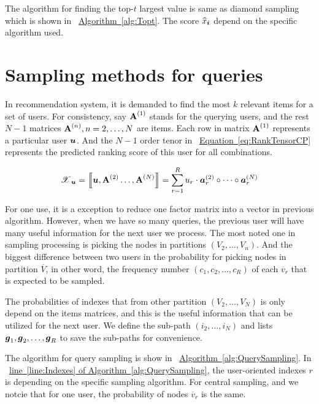 \documentclass[letterpaper]{article}
\newcommand{\T}[1]{\boldsymbol{\mathscr{\MakeUppercase{#1}}}}
\newcommand{\KT}[1]{\left\llbracket #1 \right\rrbracket}
\newcommand{\V}[1]{{\bm{{\MakeLowercase{#1}}}}}
\newcommand{\VnC}[3]{\V{#1}^{(#2)}_{#3}}
\newcommand{\M}[1]{{\bm{\mathbf{\MakeUppercase{#1}}}}}
\newcommand{\Mn}[2]{\M{#1}^{(#2)}}
\newcommand{\Eqn}[1] {\hyperref[eq:#1]  {Equation~\ref*{eq:#1}}}
\newcommand{\Alg}[1] {\hyperref[alg:#1] {Algorithm~\ref*{alg:#1}}}
\newcommand{\AlgLine}[2]{\hyperref[alg:#1]{line~\ref*{line:#2} of Algorithm~\ref*{alg:#1}}}
\begin{document}
The algorithm for finding the top-$t$ largest value is same as diamond sampling which is shown in ~\Alg{Topt}. The score $\widehat{x}_\V{i}$ depend on the specific algorithm used.


\section{Sampling methods for queries}

In recommendation system, it is demanded to find the most $k$ relevant items for a set of users. For consistency, say $\M{A}^{(1)}$ stands for the querying users, and the rest $N-1$ matrices $\M{A}^{(n)},n=2,\ldots,N$ are items. Each row in matrix $\M{A}^{(1)}$ represents a particular user $\V{u}$. And the $N-1$ order tenor in ~\Eqn{RankTensorCP} represents the predicted ranking score of this user for all combinations.

\begin{equation}\label{eq:RankTensorCP}
\T{X}_{\V{u}}= \KT{ \V{u},\Mn{A}{2}\dots,\Mn{A}{N}} =
\sum_{r=1}^{R} u_r \cdot \VnC{A}{2}{r}\circ \cdots \circ \VnC{A}{N}{r}
\end{equation}

For one use, it is a exception to reduce one factor matrix into a vector in previous algorithm. However, when we have so many queries, the previous user will have many useful information for the next user we process. The most noted one in sampling processing is picking the nodes in partitions $(V_2,\ldots,V_n)$. And the biggest difference between two users in the probability for picking nodes in partition $\overline{V}$, in other word, the frequency number $(c_1,c_2,\ldots,c_R)$ of each $\overline{v}_r$ that is expected to be sampled.

The probabilities of indexes that from other partition $(V_2,\ldots,V_N)$ is only depend on the items matrices, and this is the useful information that can be utilized for the next user. We define the sub-path $(i_2,\ldots,i_N)$ and lists $\V{g}_1,\V{g}_2,\ldots,\V{g}_R$ to save the sub-paths for convenience. 

The algorithm for query sampling is show in ~\Alg{QuerySampling}.
In ~\AlgLine{QuerySampling}{Indexes}, the user-oriented indexes $r$ is depending on the 
specific sampling algorithm. For central sampling, and we notcie that for one user, the probability of nodes $\overline{v}_r$ is the same.
\end{document}
